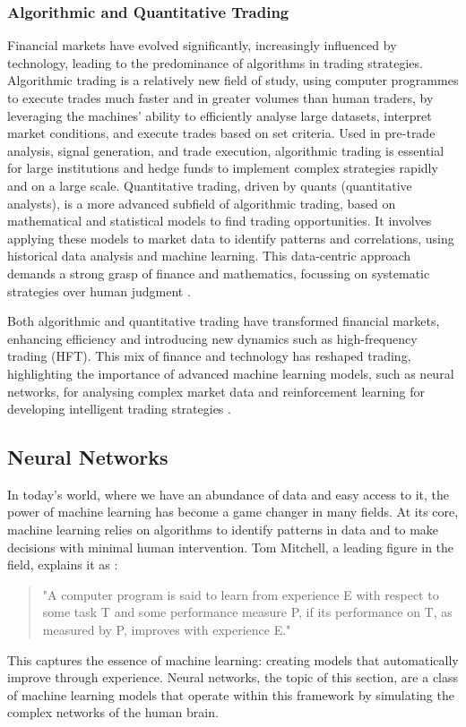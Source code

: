 \subsubsection{Algorithmic and Quantitative Trading}

Financial markets have evolved significantly, increasingly influenced by technology, leading to the predominance of algorithms in trading strategies. Algorithmic trading is a relatively new field of study, using computer programmes to execute trades much faster and in greater volumes than human traders, by leveraging the machines' ability to efficiently analyse large datasets, interpret market conditions, and execute trades based on set criteria. Used in pre-trade analysis, signal generation, and trade execution, algorithmic trading is essential for large institutions and hedge funds to implement complex strategies rapidly and on a large scale. Quantitative trading, driven by quants (quantitative analysts), is a more advanced subfield of algorithmic trading, based on mathematical and statistical models to find trading opportunities. It involves applying these models to market data to identify patterns and correlations, using historical data analysis and machine learning. This data-centric approach demands a strong grasp of finance and mathematics, focussing on systematic strategies over human judgment \cite{chan_quantitative_2021}.

Both algorithmic and quantitative trading have transformed financial markets, enhancing efficiency and introducing new dynamics such as high-frequency trading (HFT). This mix of finance and technology has reshaped trading, highlighting the importance of advanced machine learning models, such as neural networks, for analysing complex market data and reinforcement learning for developing intelligent trading strategies \cite{jansen_machine_2020}.

\subsection{Neural Networks}

In today's world, where we have an abundance of data and easy access to it, the power of machine learning has become a game changer in many fields. At its core, machine learning relies on algorithms to identify patterns in data and to make decisions with minimal human intervention. Tom Mitchell, a leading figure in the field, explains it as \cite{mitchell_machine_1997}:
\begin{quote}
"A computer program is said to learn from experience E with respect to some task T and some performance measure P, if its performance on T, as measured by P, improves with experience E."
\end{quote}
This captures the essence of machine learning: creating models that automatically improve through experience. Neural networks, the topic of this section, are a class of machine learning models that operate within this framework by simulating the complex networks of the human brain.

